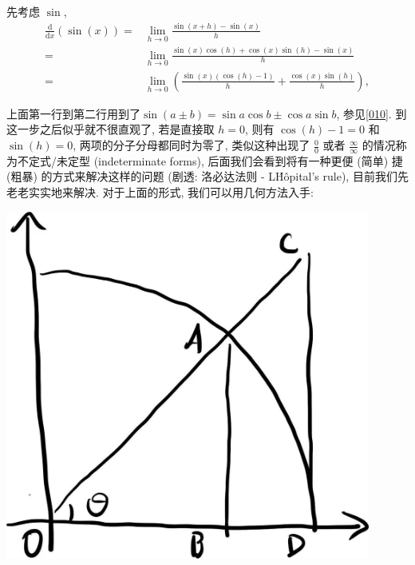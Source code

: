 \begin{tcolorbox}[size=fbox, breakable, enhanced jigsaw, title={三角函数}]

先考虑 $\sin$,
\begin{align*}
\frac{\mathrm{d}}{\mathrm{d}x}(\sin(x))=&\lim_{h\rightarrow0}\frac{\sin(x+h)-\sin(x)}{h}\\
=&\lim_{h\rightarrow0}\frac{\sin(x)\cos(h)+\cos(x)\sin(h)-\sin(x)}{h}\\
=&\lim_{h\rightarrow0}\left(\frac{\sin(x)(\cos(h)-1)}{h}+\frac{\cos(x)\sin(h)}{h}\right),
\end{align*}

上面第一行到第二行用到了$\sin(a\pm b)=\sin a\cos b\pm \cos a\sin b$, 参见\ref{010}. 到这一步之后似乎就不很直观了, 若是直接取 $h=0$, 则有 $\cos(h)-1=0$ 和
$\sin(h)=0$, 两项的分子分母都同时为零了, 类似这种出现了
$\frac{0}{0}$ 或者 $\frac{\infty}{\infty}$ 的情况称为不定式/未定型
(indeterminate forms), 后面我们会看到将有一种更便 (简单) 捷 (粗暴)
的方式来解决这样的问题 (剧透: 洛必达法则 - L\'H\^{o}pital's rule),
目前我们先老老实实地来解决. 对于上面的形式, 我们可以用几何方法入手:

\begin{tcolorbox}[size=fbox, breakable, enhanced jigsaw, sidebyside]
\includegraphics[width=0.9\textwidth]{img/image-20230529100555673.png}
\tcblower
{}
\end{tcolorbox}


\end{tcolorbox}
